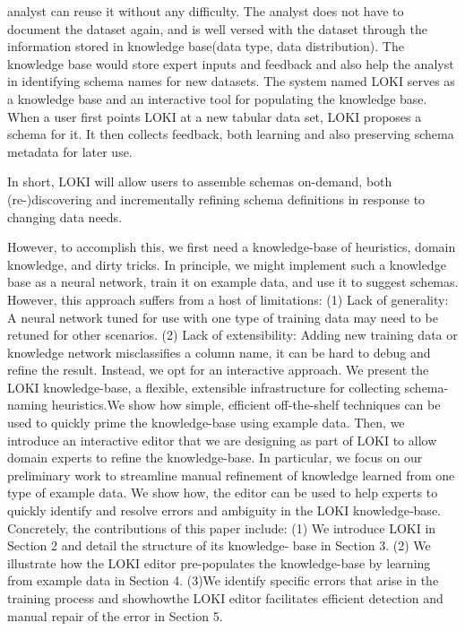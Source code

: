 \documentclass{vldb}
\begin{document}
analyst can reuse it without any difficulty. The analyst does not have to document the dataset again, and is well versed with the dataset through the information stored in knowledge base(data type, data distribution). The knowledge base would store expert inputs and feedback  and also help the analyst in identifying schema names for new datasets. The system named LOKI serves as a knowledge base and an interactive tool for populating the knowledge base. When a user first points LOKI at a new tabular data set, LOKI proposes a schema  for it. It then collects feedback, both learning and also preserving schema metadata for later use.


In short, LOKI will allow users to assemble schemas on-demand, both (re-)discovering and incrementally refining schema definitions in response to changing data needs. 

However, to accomplish this, we first need a knowledge-base of heuristics, domain knowledge, and dirty tricks. In principle, we might implement such a knowledge base as a neural network, train it on example data, and use it to suggest schemas. However, this approach suffers from a host of limitations:
(1) Lack of generality: A neural network tuned for use with one
type of training data may need to be retuned for other scenarios.
(2) Lack of extensibility: Adding new training data or knowledge network misclassifies a column name, it can be hard to debug and
refine the result. Instead, we opt for an interactive approach. We
present the LOKI knowledge-base, a flexible, extensible infrastructure
for collecting schema-naming heuristics.We show how simple,
efficient off-the-shelf techniques can be used to quickly prime the
knowledge-base using example data. Then, we introduce an interactive
editor that we are designing as part of LOKI to allow domain
experts to refine the knowledge-base. In particular, we focus on our
preliminary work to streamline manual refinement of knowledge
learned from one type of example data. We show how, the editor
can be used to help experts to quickly identify and resolve errors
and ambiguity in the LOKI knowledge-base.
Concretely, the contributions of this paper include: (1) We introduce
LOKI in Section 2 and detail the structure of its knowledge-
base in Section 3. (2) We illustrate how the LOKI editor
pre-populates the knowledge-base by learning from example data
in Section 4. (3)We identify specific errors that arise in the training
process and showhowthe LOKI editor facilitates efficient detection
and manual repair of the error in Section 5.
\end{document}
